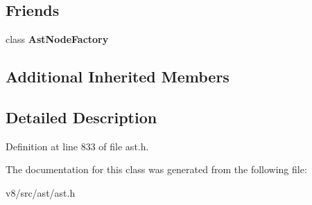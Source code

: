 \subsection*{Friends}
\begin{DoxyCompactItemize}
\item 
\mbox{\label{classv8_1_1internal_1_1WithStatement_a8d587c8ad3515ff6433eb83c578e795f}} 
class {\bfseries Ast\+Node\+Factory}
\end{DoxyCompactItemize}
\subsection*{Additional Inherited Members}


\subsection{Detailed Description}


Definition at line 833 of file ast.\+h.



The documentation for this class was generated from the following file\+:\begin{DoxyCompactItemize}
\item 
v8/src/ast/ast.\+h\end{DoxyCompactItemize}
